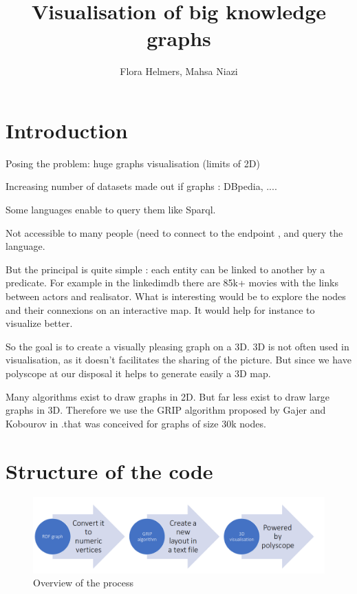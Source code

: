\documentclass{article}
\title{Visualisation of big knowledge graphs}
\author{Flora Helmers, Mahsa Niazi}
\begin{document}
\maketitle

\section*{Introduction}
Posing the problem:
huge graphs 
visualisation (limits of 2D)



Increasing number of datasets made out if graphs : DBpedia, ....

Some languages enable to query them like Sparql. 

Not accessible to many people (need to connect to the endpoint , and query the language. 

But the principal is quite simple : each entity can be linked to another by a predicate. For example in the linkedimdb there are 85k+ movies with the links between actors and realisator. 
What is interesting would be to explore the nodes and their connexions on an interactive map. It would help for instance to visualize better.

So the goal is to create a visually pleasing graph on a 3D. 
3D is not often used in visualisation, as it doesn't facilitates the sharing of the picture. But since we have polyscope at our disposal it helps to generate easily a 3D map. 

Many algorithms exist to draw graphs in 2D. But far less exist to draw large graphs in 3D. Therefore we use the GRIP algorithm proposed by Gajer and Kobourov in \cite{gajer00}.that was conceived for graphs of size 30k nodes.  


\section{Structure of the code}

\begin{figure}
    \includegraphics[width=\textwidth]{process.png}
    \caption{Overview of the process}
\end{figure}
\end{document}

